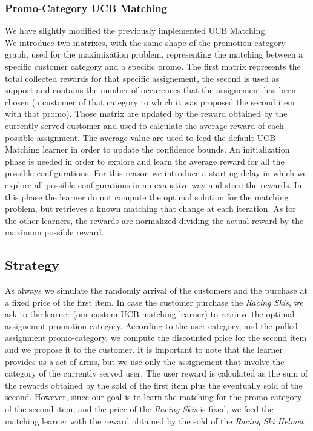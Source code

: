 \subsubsection*{Promo-Category UCB Matching}
We have slightly modified the previously implemented UCB Matching. \\
We introduce two matrixes, with the same shape of the promotion-category graph, used for the maximization problem, representing the matching between a specific customer category and a specific promo. The first matrix represents the total collected rewards for that specific assignement, the second is used as support and contains the number of occurences that the assignement has been chosen (a customer of that category to which it was proposed the second item with that promo). 
Those matrix are updated by the reward obtained by the currently served customer and used to calculate the average reward of each possible assignment. The average value are used to feed the default UCB Matching learner in order to update the confidence bounds. An initialization phase is needed in order to explore and learn the average reward for all the possible configurations. For this reason we introduce a starting delay in which we explore all possible configurations in an exaustive way and store the rewards. In this phase the learner do not compute the optimal solution for the matching problem, but retrieves a known matching that change at each iteration.
As for the other learners, the rewards are normalized dividing the actual reward by the maximum possible reward.

\subsection*{Strategy}

As always we simulate the randomly arrival of the customers and the purchase at a fixed price of the first item. In case the customer purchase the \textit{Racing Skis}, we ask to the learner (our custom UCB matching learner) to retrieve the optimal assignemnt promotion-category. According to the user category, and the pulled assignment promo-category, we compute the discounted price for the second item and we propose it to the customer. It is important to note that the learner provides us a set of arms, but we use only the assignement that involve the category of the currently served user. The user reward is calculated as the sum of the rewards obtained by the sold of the first item plus the eventually sold of the second. However, since our goal is to learn the matching for the promo-category of the second item, and the price of the \textit{Racing Skis} is fixed, we feed the matching learner with the reward obtained by the sold of the \textit{Racing Ski Helmet}. 

